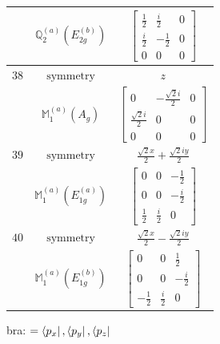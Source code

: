 \documentclass[fleqn,8pt,landscape]{jsarticle}
\begin{document}
\begin{longtable}{ccc}
$  $ & $ \mathbb{Q}_{2}^{(a)}(E_{2g}^{(b)}) $ & $ \begin{bmatrix} \frac{1}{2} & \frac{i}{2} & 0 \\ \frac{i}{2} & - \frac{1}{2} & 0 \\ 0 & 0 & 0 \end{bmatrix} $ \\ \hline
$ 38 $ & $ \text{symmetry} $ & $ z $ \\
$  $ & $ \mathbb{M}_{1}^{(a)}(A_{g}) $ & $ \begin{bmatrix} 0 & - \frac{\sqrt{2} i}{2} & 0 \\ \frac{\sqrt{2} i}{2} & 0 & 0 \\ 0 & 0 & 0 \end{bmatrix} $ \\ \hline
$ 39 $ & $ \text{symmetry} $ & $ \frac{\sqrt{2} x}{2} + \frac{\sqrt{2} i y}{2} $ \\
$  $ & $ \mathbb{M}_{1}^{(a)}(E_{1g}^{(a)}) $ & $ \begin{bmatrix} 0 & 0 & - \frac{1}{2} \\ 0 & 0 & - \frac{i}{2} \\ \frac{1}{2} & \frac{i}{2} & 0 \end{bmatrix} $ \\ \hline
$ 40 $ & $ \text{symmetry} $ & $ \frac{\sqrt{2} x}{2} - \frac{\sqrt{2} i y}{2} $ \\
$  $ & $ \mathbb{M}_{1}^{(a)}(E_{1g}^{(b)}) $ & $ \begin{bmatrix} 0 & 0 & \frac{1}{2} \\ 0 & 0 & - \frac{i}{2} \\ - \frac{1}{2} & \frac{i}{2} & 0 \end{bmatrix} $ \\ \hline
\end{longtable}
bra: $=\bra{p_{x}}, \bra{p_{y}}, \bra{p_{z}}$
\end{document}
